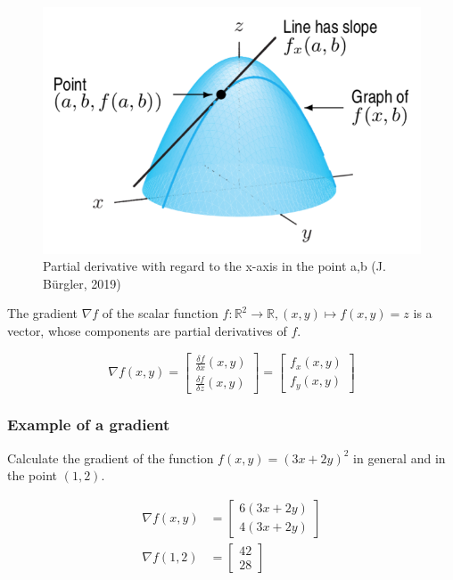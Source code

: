 \documentclass[11pt]{article}
\begin{document}
\begin{figure}[tbh!]
    \centering
    \includegraphics[keepaspectratio=true, width=0.8\linewidth]{Pictures/PartialDerivative}
    \caption{Partial derivative with regard to the x-axis in the point a,b (\textcopyright J. Bürgler, 2019)}
    \label{fig:partialderivative}
\end{figure}

The gradient $\nabla f$ of the scalar function $f: \mathbb{R}^2 \rightarrow \mathbb{R}, (x,y) \mapsto f(x,y) = z$ is a vector, whose components are partial derivatives of $f$.

\begin{equation}
    \nabla f(x,y) =
    \begin{bmatrix}
        \frac{\delta f}{\delta x}(x,y) \\
        \frac{\delta f}{\delta z}(x,y)
    \end{bmatrix}
    =
    \begin{bmatrix}
        f_x (x,y) \\
        f_y (x,y)
    \end{bmatrix}
\end{equation}

\subsubsection{Example of a gradient}

Calculate the gradient of the function $f(x,y) = (3x+2y)^2$ in general and in the point $(1,2)$.

\begin{align*}
    \nabla f(x,y) & = \begin{bmatrix}
        6(3x + 2y) \\
        4(3x + 2y)
    \end{bmatrix} \\
    \nabla f(1,2) & = \begin{bmatrix}
        42 \\
        28
    \end{bmatrix}
\end{align*}
\end{document}
